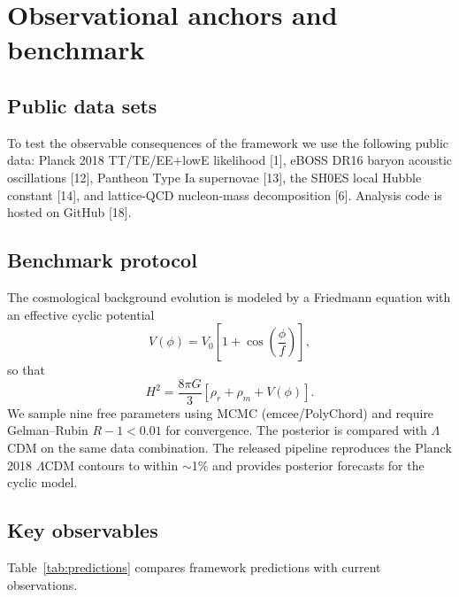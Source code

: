 \documentclass[11pt,a4paper]{article}
\begin{document}
\section{Observational anchors and benchmark}

\subsection{Public data sets}
To test the observable consequences of the framework we use the following public data: Planck 2018 TT/TE/EE+lowE likelihood [1], eBOSS DR16 baryon acoustic oscillations [12], Pantheon Type Ia supernovae [13], the SH0ES local Hubble constant [14], and lattice-QCD nucleon-mass decomposition [6]. Analysis code is hosted on GitHub [18].

\subsection{Benchmark protocol}
The cosmological background evolution is modeled by a Friedmann equation with an effective cyclic potential
\begin{equation}
V(\phi)=V_0\left[1+\cos\left(\frac{\phi}{f}\right)\right],
\end{equation}
so that
\begin{equation}
H^2=\frac{8\pi G}{3}\left[\rho_r+\rho_m+V(\phi)\right].
\end{equation}
We sample nine free parameters using MCMC (emcee/PolyChord) and require Gelman--Rubin $R-1<0.01$ for convergence. The posterior is compared with $\Lambda$CDM on the same data combination. The released pipeline reproduces the Planck 2018 $\Lambda$CDM contours to within $\sim$1\% and provides posterior forecasts for the cyclic model.

\subsection{Key observables}
Table~\ref{tab:predictions} compares framework predictions with current observations.
\end{document}
